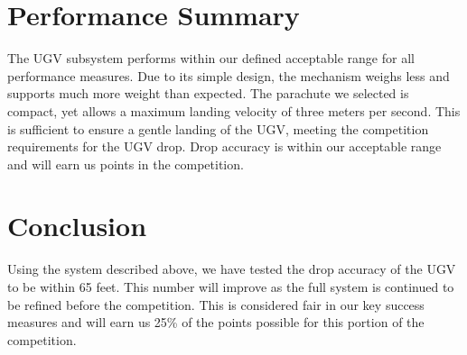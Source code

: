 \documentclass[]{auvsi_doc}
\begin{document}
\section{Performance Summary}
The UGV subsystem performs within our defined acceptable range for all performance measures.
Due to its simple design, the mechanism weighs less and supports much more weight than expected. 
The parachute we selected is compact, yet allows a maximum landing velocity of three meters per second. This is sufficient to ensure a gentle landing of the UGV, meeting the competition requirements for the UGV drop. Drop accuracy is within our acceptable range and will earn us points in the competition.

\section{Conclusion}
Using the system described above, we have tested the drop accuracy of the UGV to be within 65 feet. This number will improve as the full system is continued to be refined before the competition. 
This is considered fair in our key success measures and will earn us 25\% of the points possible for this portion of the competition.
\end{document}
